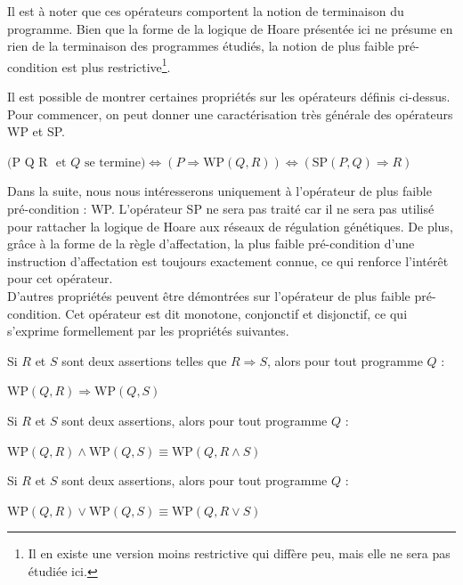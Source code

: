 Il est à noter que ces opérateurs comportent la notion de terminaison du programme. Bien que la forme de la logique de Hoare présentée ici ne présume en rien de la terminaison des programmes étudiés, la notion de plus faible pré-condition est plus restrictive\footnote{Il en existe une version moins restrictive qui diffère peu, mais elle ne sera pas étudiée ici.}.

Il est possible de montrer certaines propriétés sur les opérateurs définis ci-dessus. Pour commencer, on peut donner une caractérisation très générale des opérateurs WP et SP.
\begin{propriete}[Caractérisation de WP et SP]
\begin{listesanspuce}
  \item $($\hbegini P \ha Q \hb R \hendi $\text{ et $Q$ se termine}) \Leftrightarrow (P \Rightarrow \mathrm{WP}(Q, R)) \Leftrightarrow (\mathrm{SP}(P, Q) \Rightarrow R)$
\end{listesanspuce}
\end{propriete}

Dans la suite, nous nous intéresserons uniquement à l'opérateur de plus faible pré-condition : WP. L'opérateur SP ne sera pas traité car il ne sera pas utilisé pour rattacher la logique de Hoare aux réseaux de régulation génétiques. De plus, grâce à la forme de la règle d'affectation, la plus faible pré-condition d'une instruction d'affectation est toujours exactement connue, ce qui renforce l'intérêt pour cet opérateur.\\

D'autres propriétés peuvent être démontrées sur l'opérateur de plus faible pré-condition. Cet opérateur est dit monotone, conjonctif et disjonctif, ce qui s'exprime formellement par les propriétés suivantes.
\begin{propriete}[Monotonie de WP]
Si $R$ et $S$ sont deux assertions telles que $R \Rightarrow S$, alors pour tout programme $Q$ :
\begin{listesanspuce}
  \item $\mathrm{WP}(Q, R) \Rightarrow \mathrm{WP}(Q, S)$
\end{listesanspuce}
\end{propriete}
\begin{propriete}[Conjonction de WP]
Si $R$ et $S$ sont deux assertions, alors pour tout programme $Q$ :
\begin{listesanspuce}
  \item $\mathrm{WP}(Q, R) \wedge \mathrm{WP}(Q, S) \equiv \mathrm{WP}(Q, R \wedge S)$
\end{listesanspuce}
\end{propriete}
\begin{propriete}[Disjonction de WP]
Si $R$ et $S$ sont deux assertions, alors pour tout programme $Q$ :
\begin{listesanspuce}
  \item $\mathrm{WP}(Q, R) \vee \mathrm{WP}(Q, S) \equiv \mathrm{WP}(Q, R \vee S)$
\end{listesanspuce}
\end{propriete}


